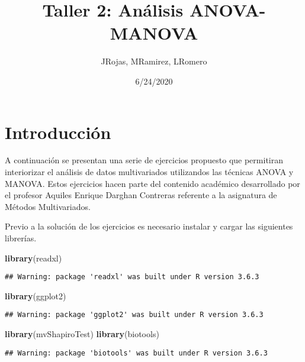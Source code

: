 \documentclass[
]{article}
\title{Taller 2: Análisis ANOVA-MANOVA}
\author{JRojas, MRamirez, LRomero}
\date{6/24/2020}
\newenvironment{Shaded}{\begin{snugshade}}{\end{snugshade}}
\newcommand{\KeywordTok}[1]{\textcolor[rgb]{0.13,0.29,0.53}{\textbf{#1}}}
\newcommand{\NormalTok}[1]{#1}
\begin{document}
\maketitle

\hypertarget{introducciuxf3n}{%
\section{Introducción}\label{introducciuxf3n}}

A continuación se presentan una serie de ejercicios propuesto que
permitiran interiorizar el análisis de datos multivariados utilizandos
las técnicas ANOVA y MANOVA. Estos ejercicios hacen parte del contenido
académico desarrollado por el profesor Aquiles Enrique Darghan Contreras
referente a la asignatura de Métodos Multivariados.

Previo a la solución de los ejercicios es necesario instalar y cargar
las siguientes librerías.

\begin{Shaded}
\begin{Highlighting}[]
\KeywordTok{library}\NormalTok{(readxl)}
\end{Highlighting}
\end{Shaded}

\begin{verbatim}
## Warning: package 'readxl' was built under R version 3.6.3
\end{verbatim}

\begin{Shaded}
\begin{Highlighting}[]
\KeywordTok{library}\NormalTok{(ggplot2)}
\end{Highlighting}
\end{Shaded}

\begin{verbatim}
## Warning: package 'ggplot2' was built under R version 3.6.3
\end{verbatim}

\begin{Shaded}
\begin{Highlighting}[]
\KeywordTok{library}\NormalTok{(mvShapiroTest)}
\KeywordTok{library}\NormalTok{(biotools)}
\end{Highlighting}
\end{Shaded}

\begin{verbatim}
## Warning: package 'biotools' was built under R version 3.6.3
\end{verbatim}
\end{document}
